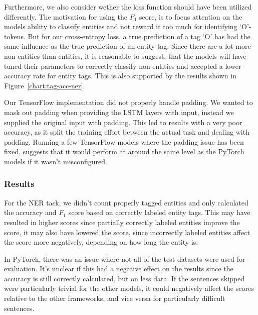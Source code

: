 Furthermore, we also consider wether the loss function should have been utilized
differently. The motivation for using the $F_{1}$ score, is to focus attention
on the models ability to classify entities and not reward it too much for
identifying `O'-tokens. But for our cross-entropy loss, a true prediction of a
tag `O' has had the same influence as the true prediction of an entity tag.
Since there are a lot more non-entities than entities, it is reasonable to
suggest, that the models will have tuned their parameters to correctly classify
non-entities and accepted a lower accuracy rate for entity tags. This is also
supported by the results shown in Figure~\ref{chart:tag-acc-ner}.

Our TensorFlow implementation did not properly handle padding. We wanted to mask
out padding when providing the LSTM layers with input, instead we supplied the
original input with padding. This led to results with a very poor
accuracy, as it split the training effort between the actual task and dealing
with padding. Running a few TensorFlow models where the padding issue has been
fixed, suggests that it would perform at around the same level as the PyTorch
models if it wasn't misconfigured.

\subsubsection{Results}

For the NER task, we didn't count properly tagged entities and only calculated
the accuracy and $F_1$ score based on correctly labeled entity tags. This
may have resulted in higher scores since partially correctly labeled entities
improve the score, it may also have lowered the score, since incorrectly labeled
entities affect the score more negatively, depending on how long the entity is. 

In PyTorch, there was an issue where not all of the test datasets were used for
evaluation. It's unclear if this had a negative effect on the results since the
accuracy is still correctly calculated, but on less data. If the sentences
skipped were particularly trivial for the other models, it could negatively
affect the scores relative to the other frameworks, and vice versa for
particularly difficult sentences.



